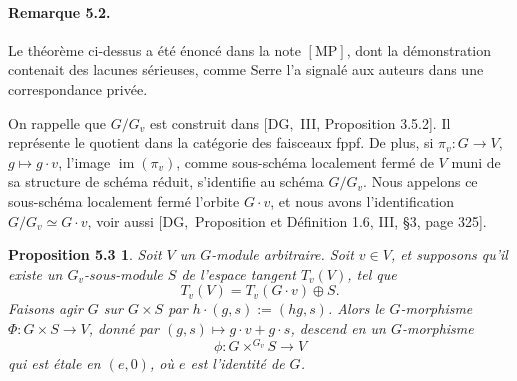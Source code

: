\documentclass[11pt]{article}
\newtheorem*{proposition53}{Proposition 5.3}
\begin{document}
\paragraph{Remarque 5.2.}
Le théorème ci-dessus a été énoncé dans la note \([\mathrm{MP}]\), dont la démonstration
contenait des lacunes sérieuses, comme Serre l'a signalé aux auteurs dans une correspondance
privée.

On rappelle que \(G/G_v\) est construit dans \([\mathrm{DG},\) III, Proposition 3.5.2]. Il
représente le quotient dans la catégorie des faisceaux fppf. De plus, si
\(\pi_v:G\to V\), \(g\mapsto g\cdot v\), l'image \(\operatorname{im}(\pi_v)\), comme
sous-schéma localement fermé de \(V\) muni de sa structure de schéma réduit, s'identifie au
schéma \(G/G_v\). Nous appelons ce sous-schéma localement fermé l'orbite \(G\cdot v\), et
nous avons l'identification \(G/G_v\simeq G\cdot v\), voir aussi \([\mathrm{DG},\)
Proposition et Définition 1.6, III, \S3, page 325].

\begin{proposition53}
Soit \(V\) un \(G\)-module arbitraire. Soit \(v\in V\), et supposons qu'il existe un
\(G_v\)-sous-module \(S\) de l'espace tangent \(T_v(V)\), tel que
\[
  T_v(V)=T_v(G\cdot v)\oplus S.
\]
Faisons agir \(G\) sur \(G\times S\) par \(h\cdot(g,s):=(h g,s)\). Alors le
\(G\)-morphisme \(\Phi:G\times S\to V\), donné par \((g,s)\mapsto g\cdot v+g\cdot s\),
descend en un \(G\)-morphisme
\begin{equation}
  \phi:G\times^{G_v}S\longrightarrow V
  \tag{5.3.1}
\end{equation}
qui est étale en \((e,0)\), où \(e\) est l'identité de \(G\).
\end{proposition53}
\end{document}
